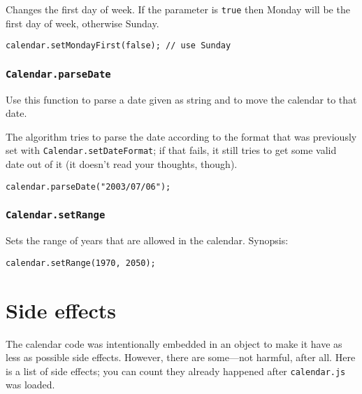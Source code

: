 \documentclass[a4paper,10pt]{article}
\begin{document}
Changes the first day of week.  If the parameter is \texttt{true} then Monday
will be the first day of week, otherwise Sunday.

\begin{verbatim}
calendar.setMondayFirst(false); // use Sunday
\end{verbatim}

\subsubsection{\texttt{Calendar.parseDate}}\label{sec:Calendar.parseDate}

Use this function to parse a date given as string and to move the calendar to
that date.

The algorithm tries to parse the date according to the format that was
previously set with \texttt{Calendar.setDateFormat}; if that fails, it still
tries to get some valid date out of it (it doesn't read your thoughts, though).

\begin{verbatim}
calendar.parseDate("2003/07/06");
\end{verbatim}

\subsubsection{\texttt{Calendar.setRange}}\label{sec:Calendar.setRange}

Sets the range of years that are allowed in the calendar.  Synopsis:

\begin{verbatim}
calendar.setRange(1970, 2050);
\end{verbatim}







\section{Side effects}

The calendar code was intentionally embedded in an object to make it have as
less as possible side effects.  However, there are some---not harmful, after
all.  Here is a list of side effects; you can count they already happened after
\texttt{calendar.js} was loaded.
\end{document}
